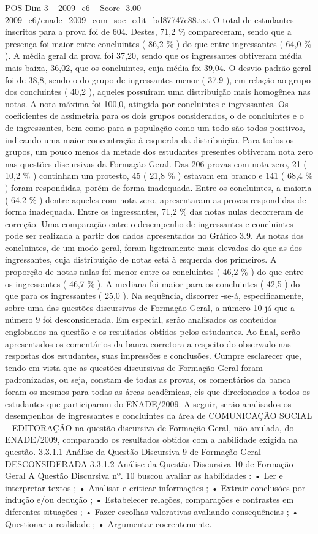 \begin{textsample}{POS Dim 3 – 2009\_c6 – Score -3.00 – 2009\_c6/enade\_2009\_com\_soc\_edit\_bd87747c88.txt}
O total de estudantes inscritos para a prova foi de 604.
Destes, 71,2 \% compareceram, sendo que a presença foi maior entre concluintes ( 86,2 \% ) do que entre ingressantes ( 64,0 \% ).
A média geral da prova foi 37,20, sendo que os ingressantes obtiveram média mais baixa, 36,02, que os concluintes, cuja média foi 39,04.
O desvio-padrão geral foi de 38,8, sendo o do grupo de ingressantes menor ( 37,9 ), em relação ao grupo dos concluintes ( 40,2 ), aqueles possuíram uma distribuição mais homogênea nas notas.
A nota máxima foi 100,0, atingida por concluintes e ingressantes.
Os coeficientes de assimetria para os dois grupos considerados, o de concluintes e o de ingressantes, bem como para a população como um todo são todos positivos, indicando uma maior concentração à esquerda da distribuição.
Para todos os grupos, um pouco menos da metade dos estudantes presentes obtiveram nota zero nas questões discursivas da Formação Geral.
Das 206 provas com nota zero, 21 ( 10,2 \% ) continham um protesto, 45 ( 21,8 \% ) estavam em branco e 141 ( 68,4 \% ) foram respondidas, porém de forma inadequada.
Entre os concluintes, a maioria ( 64,2 \% ) dentre aqueles com nota zero, apresentaram as provas respondidas de forma inadequada.
Entre os ingressantes, 71,2 \% das notas nulas decorreram de correção.
Uma comparação entre o desempenho de ingressantes e concluintes pode ser realizada a partir dos dados apresentados no Gráfico 3.9.
As notas dos concluintes, de um modo geral, foram ligeiramente mais elevadas do que as dos ingressantes, cuja distribuição de notas está à esquerda dos primeiros.
A proporção de notas nulas foi menor entre os concluintes ( 46,2 \% ) do que entre os ingressantes ( 46,7 \% ).
A mediana foi maior para os concluintes ( 42,5 ) do que para os ingressantes ( 25,0 ).
Na sequência, discorrer -se-á, especificamente, sobre uma das questões discursivas de Formação Geral, a número 10 já que a número 9 foi desconsiderada.
Em especial, serão analisados os conteúdos englobados na questão e os resultados obtidos pelos estudantes.
Ao final, serão apresentados os comentários da banca corretora a respeito do observado nas respostas dos estudantes, suas impressões e conclusões.
Cumpre esclarecer que, tendo em vista que as questões discursivas de Formação Geral foram padronizadas, ou seja, constam de todas as provas, os comentários da banca foram os mesmos para todas as áreas acadêmicas, eis que direcionados a todos os estudantes que participaram do ENADE/2009.
A seguir, serão analisados os desempenhos de ingressantes e concluintes da área de COMUNICAÇÃO SOCIAL – EDITORAÇÃO na questão discursiva de Formação Geral, não anulada, do ENADE/2009, comparando os resultados obtidos com a habilidade exigida na questão. 3.3.1.1 Análise da Questão Discursiva 9 de Formação Geral DESCONSIDERADA 3.3.1.2 Análise da Questão Discursiva 10 de Formação Geral A Questão Discursiva nº. 10 buscou avaliar as habilidades : • Ler e interpretar textos ; • Analisar e criticar informações ; • Extrair conclusões por indução e/ou dedução ; • Estabelecer relações, comparações e contrastes em diferentes situações ; • Fazer escolhas valorativas avaliando consequências ; • Questionar a realidade ; • Argumentar coerentemente.

\end{textsample}
